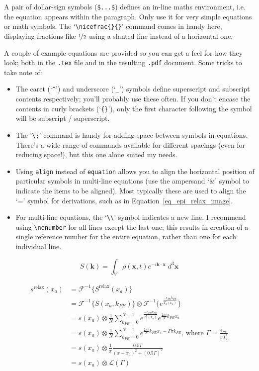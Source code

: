 A pair of dollar-sign symbols (\verb+$...$+) defines an in-line maths environment, i.e. the equation appears within the paragraph. Only use it for very simple equations or math symbols. The `\verb+\nicefrac{}{}+' command comes in handy here, displaying fractions like $\nicefrac{1}{2}$ using a slanted line instead of a horizontal one.

A couple of example equations are provided so you can get a feel for how they look; both in the \verb+.tex+ file and in the resulting \verb+.pdf+ document. Some tricks to take note of:

\begin{itemize}
\item The caret (`\verb+^+') and underscore (`\verb+_+') symbols define superscript and subscript contents respectively; you'll probably use these often. If you don't encase the contents in curly brackets (`\verb+{}+'), only the first character following the symbol will be subscript / superscript.
\item The `\verb+\;+' command is handy for adding space between symbols in equations. There's a wide range of commands available for different spacings (even for reducing space!), but this one alone suited my needs.
\item Using \verb+align+ instead of \verb+equation+ allows you to align the horizontal position of particular symbols in multi-line equations (use the ampersand `\&' symbol to indicate the items to be aligned). Most typically these are used to align the `=' symbol for derivations, such as in Equation~\ref{eq_epi_relax_image}.
\item For multi-line equations, the `\verb+\\+' symbol indicates a new line. I recommend using \verb+\nonumber+ for all lines except the last one; this results in creation of a single reference number for the entire equation, rather than one for each individual line.
\end{itemize}

\begin{equation}
S(\mathbf{k}) = \int_V \rho(\mathbf{x}, t) e^{-i \mathbf{k} \cdot \mathbf{x}} \; d^3 \mathbf{x}
\label{eq_kspace_final}
\end{equation}

\begin{align}
s^{\text{relax}} (x_a)
&= \mathcal{F}^{-1} \lbrace S^{\text{relax}} (x_a) \rbrace \nonumber \\
&= \mathcal{F}^{-1} \lbrace S(x_a,k_{PE}) \rbrace \otimes \mathcal{F}^{-1} \lbrace e^\frac{-\epsilon_{PE} k_{PE}}{T_2^{*}(x_a)} \rbrace \nonumber \\
&= s(x_a) \otimes \frac{1}{N} \sum \limits_{k_{PE}=0}^{N-1} e^\frac{-\epsilon_{PE} k_{PE}}{T_2^{*}(x_a)} e^{\frac{2 \pi i}{N} k_{PE} x_a} \nonumber \\
&= s(x_a) \otimes \frac{1}{N} \sum \limits_{k_{PE}=0}^{N-1} e^{\frac{2 \pi i}{N} k_{PE} x_a - \Gamma \pi k_{PE}} \text{, where } \Gamma = \frac{\epsilon_{PE}}{\pi T_2^{*}} \nonumber \\
&= s(x_a) \otimes \frac{1}{\pi} \frac{0.5\Gamma}{(x-x_a)^2 + (0.5\Gamma)^2} \nonumber \\
&= s(x_a) \otimes \mathcal{L}(\Gamma)
\label{eq_epi_relax_image}
\end{align}
%
%

